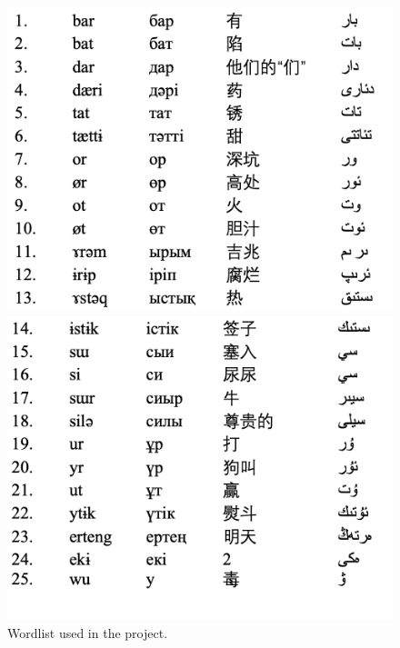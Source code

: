 \documentclass[
  man,floatsintext]{apa6}
\begin{document}
\begin{figure}[ht]
\centering
\begin{minipage}{0.48\textwidth}
  \includegraphics[width=\linewidth]{finalimages/wordlist1.png}
\end{minipage}
\hfill
\begin{minipage}{0.48\textwidth}
  \includegraphics[width=\linewidth]{finalimages/wordlist2.png}
\end{minipage}
\caption{Wordlist used in the project.}
\end{figure}
\end{document}
